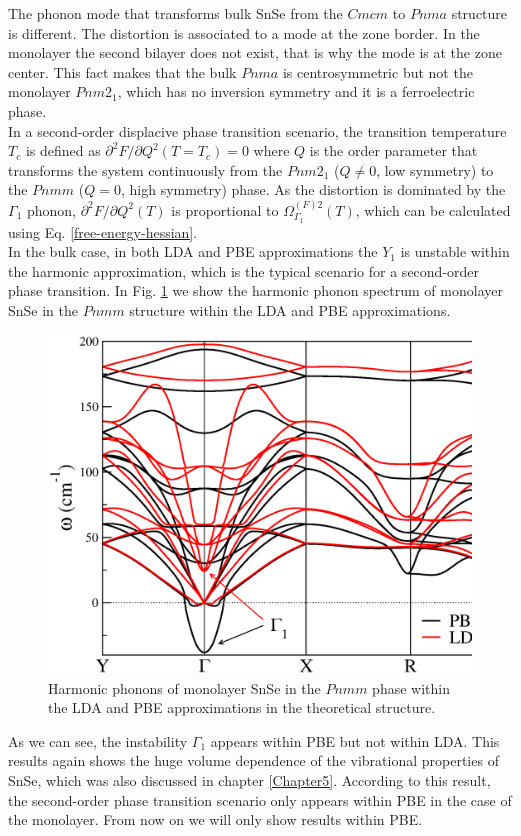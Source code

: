 The phonon mode that transforms bulk SnSe from the $Cmcm$ to $Pnma$ structure is different. The distortion is 
associated to a mode at the zone border. In the monolayer the second bilayer does not exist, that is why the mode is 
at the zone center. This fact makes that the bulk $Pnma$ is centrosymmetric but not the monolayer $Pnm2_{1}$, which 
has no inversion symmetry and it is a ferroelectric phase. \\

In a second-order displacive phase transition scenario, the transition temperature $T_{c}$ is defined as 
$\partial^{2}F/\partial Q^{2}(T=T_{c})=0$ where $Q$ is the order parameter that transforms the system continuously 
from the $Pnm2_{1}$ ($Q\ne0$, low symmetry) to the $Pnmm$ ($Q=0$, high symmetry) phase. As the distortion is 
dominated by the $\Gamma_{1}$ phonon, $\partial^{2}F/\partial Q^{2}(T)$ is proportional to 
$\Omega^{(F)2}_{\Gamma_{1}}(T)$, which can be calculated using Eq. \ref{free-energy-hessian}. \\

In the bulk case, in both LDA and PBE approximations the $Y_{1}$ is unstable within the harmonic approximation, 
which is the typical scenario for a second-order phase transition. In Fig. \ref{harmonic-mono} we show the 
harmonic phonon spectrum of monolayer SnSe in the $Pnmm$ structure within the LDA and PBE approximations. 
\begin{figure}[h]
\includegraphics[width=\linewidth]{Figures/harmonic-mono.eps}
\caption[Harmonic phonons of monolayer SnSe.]{Harmonic phonons of monolayer SnSe in the $Pnmm$ phase within the LDA 
and PBE approximations in the theoretical structure.}
\label{harmonic-mono}
\end{figure}
As we can see, the instability $\Gamma_{1}$ appears within PBE but not within LDA. This results again shows the huge 
volume dependence of the vibrational properties of SnSe, which was also discussed in chapter \ref{Chapter5}. 
According to this result, the second-order phase transition scenario only appears within PBE in the case of the 
monolayer. From now on we will only show results within PBE. \\

